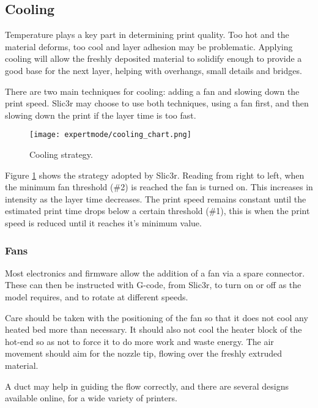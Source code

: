 
\subsection{Cooling} %
\label{sec:cooling}

Temperature plays a key part in determining print quality.  Too hot and the material deforms, too cool and layer adhesion may be problematic.  Applying cooling will allow the freshly deposited material to solidify enough to provide a good base for the next layer, helping with overhangs, small details and bridges.

There are two main techniques for cooling: adding a fan and slowing down the print speed.  Slic3r may choose to use both techniques, using a fan first, and then slowing down the print if the layer time is too fast.

\begin{figure}[H]
\centering
\texttt{[image: expertmode/cooling\_chart.png]}
\caption{Cooling strategy.}
\label{fig:cooling_chart}
\end{figure}

Figure \ref{fig:cooling_chart} shows the strategy adopted by Slic3r.  Reading from right to left, when the minimum fan threshold (\#2) is reached the fan is turned on.  This increases in intensity as the layer time decreases.  The print speed remains constant until the estimated print time drops below a certain threshold (\#1), this is when the print speed is reduced until it reaches it's minimum value.

\subsubsection{Fans} %
\label{sub:fans}
Most electronics and firmware allow the addition of a fan via a spare connector.  These can then be instructed with G-code, from Slic3r, to turn on or off as the model requires, and to rotate at different speeds.

Care should be taken with the positioning of the fan so that it does not cool any heated bed more than necessary.  It should also not cool the heater block of the hot-end so as not to force it to do more work and waste energy.  The air movement should aim for the nozzle tip, flowing over the freshly extruded material.

A duct may help in guiding the flow correctly, and there are several designs available online, for a wide variety of printers.

